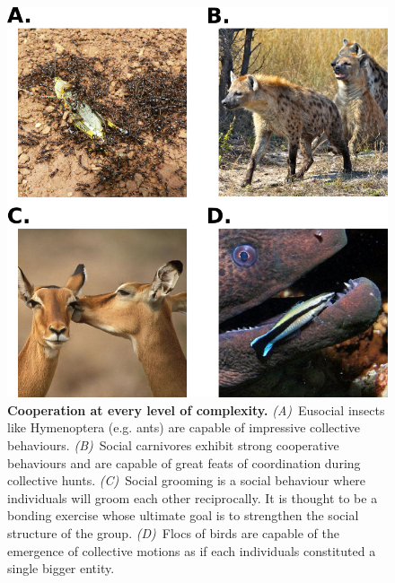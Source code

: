     \begin{figure}[hbtp]
        \begin{center}
          \includegraphics[scale = 0.30]{fig/Intro/CooperationExamples.png}
          \caption{\textbf{Cooperation at every level of complexity.} {\em (A)}~Eusocial insects like Hymenoptera (e.g. ants) are capable of impressive collective behaviours. {\em (B)}~Social carnivores exhibit strong cooperative behaviours and are capable of great feats of coordination during collective hunts. {\em (C)}~Social grooming is a social behaviour where individuals will groom each other reciprocally. It is thought to be a bonding exercise whose ultimate goal is to strengthen the social structure of the group. {\em (D)}~Flocs of birds are capable of the emergence of collective motions as if each individuals constituted a single bigger entity.} 
          \label{fig:CooperationExamples}
        \end{center}
    \end{figure}


